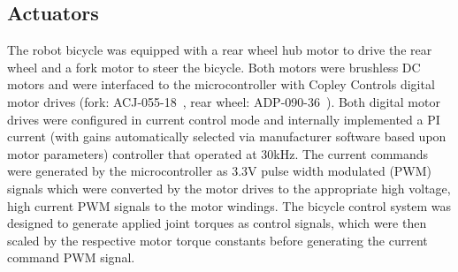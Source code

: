 %


\subsection{Actuators} \label{rb:subsec:actuators}
The robot bicycle was equipped with a rear wheel hub motor to drive the rear
wheel and a fork motor to steer the bicycle. Both motors were brushless DC
motors and were interfaced to the microcontroller with Copley Controls digital
motor drives (fork: ACJ-055-18~\cite{CopleyACJ}, rear wheel:
ADP-090-36~\cite{CopleyADP}). Both digital motor drives were configured in
current control mode and internally implemented a PI current (with gains
automatically selected via manufacturer software based upon motor parameters)
controller that operated at 30kHz. The current commands were generated by the
microcontroller as 3.3V pulse width modulated (PWM) signals which were
converted by the motor drives to the appropriate high voltage, high current PWM
signals to the motor windings. The bicycle control system was designed to
generate applied joint torques as control signals, which were then scaled by
the respective motor torque constants before generating the current command PWM
signal.

